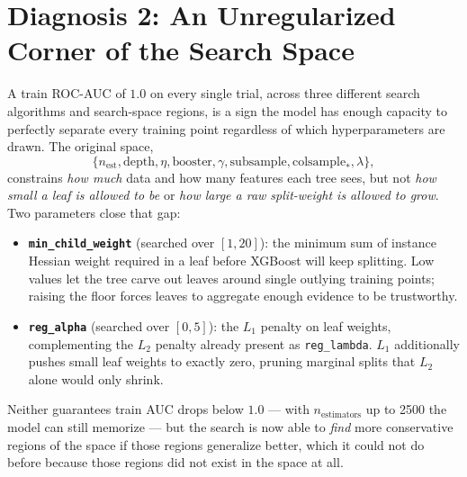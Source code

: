 \documentclass[conference]{IEEEtran}
\begin{document}
\section*{Diagnosis 2: An Unregularized Corner of the Search Space}
A train ROC-AUC of $1.0$ on every single trial, across three different search algorithms and search-space regions, is a sign the model has enough capacity to perfectly separate every training point regardless of which hyperparameters are drawn. The original space,
\begin{equation}
    \{n_{\text{est}}, \text{depth}, \eta, \text{booster}, \gamma, \text{subsample}, \text{colsample}_{*}, \lambda\},
\end{equation}
constrains \emph{how much} data and how many features each tree sees, but not \emph{how small a leaf is allowed to be} or \emph{how large a raw split-weight is allowed to grow}. Two parameters close that gap:
\begin{itemize}
    \item \textbf{\texttt{min\_child\_weight}} (searched over $[1, 20]$): the minimum sum of instance Hessian weight required in a leaf before XGBoost will keep splitting. Low values let the tree carve out leaves around single outlying training points; raising the floor forces leaves to aggregate enough evidence to be trustworthy.
    \item \textbf{\texttt{reg\_alpha}} (searched over $[0, 5]$): the $L_1$ penalty on leaf weights, complementing the $L_2$ penalty already present as \texttt{reg\_lambda}. $L_1$ additionally pushes small leaf weights to exactly zero, pruning marginal splits that $L_2$ alone would only shrink.
\end{itemize}
Neither guarantees train AUC drops below $1.0$ --- with $n_{\text{estimators}}$ up to 2500 the model can still memorize --- but the search is now able to \emph{find} more conservative regions of the space if those regions generalize better, which it could not do before because those regions did not exist in the space at all.
\end{document}
